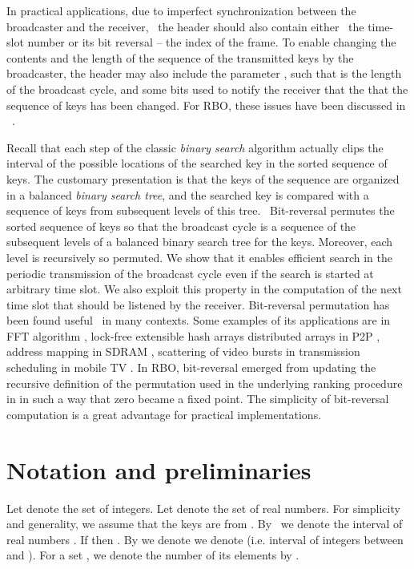 \documentclass{article}
\newcommand{\tmem}[1]{{\em #1\/}}
\begin{document}
In practical applications, due to imperfect synchronization between the
broadcaster and the receiver, \ the header should also contain either \ the
time-slot number or its bit reversal -- the index of the frame. To enable
changing the contents and the length of the sequence of the transmitted keys
by the broadcaster, the header may also include the parameter , such that
 is the length of the broadcast cycle, and some bits used to notify the
receiver that the that the sequence of keys has been changed. For RBO, these
issues have been discussed in \ {\cite{DBLP:journals/corr/abs-1108-5095}}.

Recall that each step of the classic {\tmem{binary search}} algorithm actually
clips the interval of the possible locations of the searched key in the sorted
sequence of keys. The customary presentation is that the keys of the sequence
are organized in a balanced {\tmem{binary search tree}}, and the searched key
is compared with a sequence of keys from subsequent levels of this tree. \
Bit-reversal permutes the sorted sequence of keys so that the broadcast cycle
is a sequence of the subsequent levels of a balanced binary search tree for
the keys. Moreover, each level is recursively so permuted. We show that it
enables efficient search in the periodic transmission of the broadcast cycle
even if the search is started at arbitrary time slot. We also exploit this
property in the computation of the next time slot that should be listened by
the receiver. Bit-reversal permutation has been found useful \ in many
contexts. Some examples of its applications are in FFT algorithm
{\cite{CooleyTukey}} {\cite{CormenLR89}}, lock-free extensible hash arrays
{\cite{DBLP:journals/jacm/ShalevS06}} distributed arrays in P2P
{\cite{DBLP:conf/infocom/FukuchiSSH09}}, address mapping in SDRAM
{\cite{DBLP:conf/scopes/ShaoD05}}, scattering of video bursts in transmission
scheduling in mobile TV {\cite{DBLP:journals/ton/HefeedaH10}}. In RBO,
bit-reversal emerged from updating the recursive definition of the
 permutation used in the underlying ranking procedure in
{\cite{DBLP:conf/adhoc-now/Kik08}} in such a way that zero became a fixed
point. The simplicity of bit-reversal computation is a great advantage for
practical implementations.

\section{Notation and preliminaries}

Let  denote the set of integers. Let  denote the set
of real numbers. For simplicity and generality, we assume that the keys are
from . By \  we denote the interval of real numbers . If  then . By
 we denote we denote  (i.e. interval of
integers between  and ). For a set , we denote the number
of its elements by .
\end{document}
